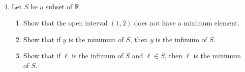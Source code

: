 \documentclass[12pt]{amsart}
\newcommand{\R}{\mathbb{R}}
\begin{document}
\


\begin{enumerate}\setcounter{enumi}{3}
\item Let $S$ be a subset of $\R$.
\begin{enumerate}
\item Show that the open interval $(1,2)$ does not have a minimum element.
\item Show that if $y$ is the minimum of $S$, then $y$ is the infimum of $S$.
\item Show that if $\ell$ is the infimum of $S$ and $\ell \in S$, then $\ell$ is the minimum of $S$.
\end{enumerate}
\end{enumerate}
\end{document}
